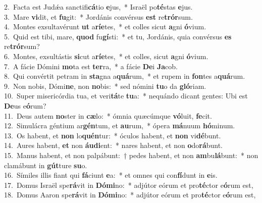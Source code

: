 {2.~}Facta est Judǽa sanctifi\textbf{cá}tio \textbf{e}jus,~* Israël po\textbf{té}stas \textbf{e}jus.\\
{3.~}Mare \textbf{vi}dit, et \textbf{fu}git:~* Jordánis convérsus \textbf{est} re\textbf{trór}sum.\\
{4.~}Montes exsultavérunt \textbf{ut} a\textbf{rí}\textbf{e}tes,~* et colles sicut \textbf{a}gni \textbf{ó}vium.\\
{5.~}Quid est tibi, mare, \textbf{quod} fu\textbf{gí}sti:~* et tu, Jordánis, quia convérsus \textbf{es} re\textbf{trór}sum?\\
{6.~}Montes, exsultástis \textbf{si}cut a\textbf{rí}\textbf{e}tes,~* et colles, sicut \textbf{a}gni \textbf{ó}vium.\\
{7.~}A fácie Dómini \textbf{mo}ta est \textbf{ter}ra,~* a fácie \textbf{De}i \textbf{Ja}cob.\\
{8.~}Qui convértit petram in \textbf{sta}gna a\textbf{quá}rum,~* et rupem in \textbf{fon}tes a\textbf{quá}rum.\\
{9.~}Non nobis, Dómi\textbf{ne}, non \textbf{no}bis:~* sed nómini \textbf{tu}o da \textbf{gló}riam.\\
{10.~}Super misericórdia tua, et veri\textbf{tá}te \textbf{tu}a:~* nequándo dicant gentes: Ubi est \textbf{De}us e\textbf{ó}rum?\\
{11.~}Deus autem \textbf{no}ster in \textbf{cæ}lo:~* ómnia quæcúmque \textbf{vó}luit, \textbf{fe}cit.\\
{12.~}Simulácra géntium ar\textbf{gén}tum, et \textbf{au}rum,~* ópera \textbf{má}nuum \textbf{hó}minum.\\
{13.~}Os habent, et \textbf{non} lo\textbf{quén}tur:~* óculos habent, et \textbf{non} vi\textbf{dé}bunt.\\
{14.~}Aures habent, \textbf{et} non \textbf{áu}\textbf{di}ent:~* nares habent, et non \textbf{o}do\textbf{rá}bunt.\\
{15.~}Manus habent, et non palpábunt:~† pedes habent, et non \textbf{am}bu\textbf{lá}bunt:~* non clamábunt in \textbf{gút}ture \textbf{su}o.\\
{16.~}Símiles illis fiant qui \textbf{fá}ciunt \textbf{e}a:~* et omnes qui con\textbf{fí}dunt in \textbf{e}is.\\
{17.~}Domus Israël spe\textbf{rá}vit in \textbf{Dó}\textbf{mi}no:~* adjútor eórum et pro\textbf{té}ctor e\textbf{ó}rum est,\\
{18.~}Domus Aaron spe\textbf{rá}vit in \textbf{Dó}\textbf{mi}no:~* adjútor eórum et pro\textbf{té}ctor e\textbf{ó}rum est,\\

